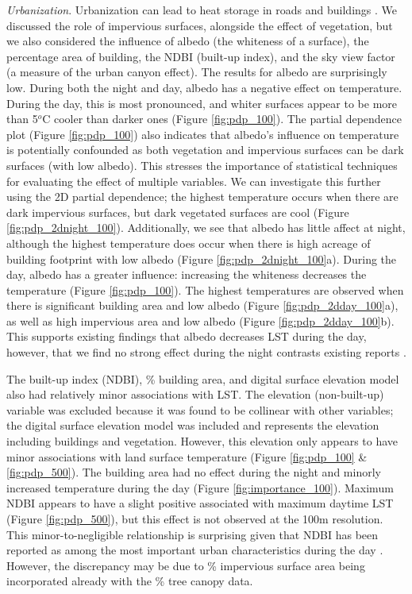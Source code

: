 \documentclass[review]{elsarticle}
\begin{document}
\textit{Urbanization}.
Urbanization can lead to heat storage in roads and buildings \cite{Zhou2014-wc, Voogt2003-mm}. 
We discussed the role of impervious surfaces, alongside the effect of vegetation, but we also considered the influence of albedo (the whiteness of a surface), the percentage area of building, the NDBI (built-up index), and the sky view factor (a measure of the urban canyon effect).
The results for albedo are surprisingly low.
During both the night and day, albedo has a negative effect on temperature.
During the day, this is most pronounced, and whiter surfaces appear to be more than 5$^o$C cooler than darker ones (Figure \ref{fig:pdp_100}).
The partial dependence plot (Figure \ref{fig:pdp_100}) also indicates that albedo's influence on temperature is potentially confounded as both vegetation and impervious surfaces can be dark surfaces (with low albedo).
This stresses the importance of statistical techniques for evaluating the effect of multiple variables.
We can investigate this further using the 2D partial dependence; the highest temperature occurs when there are dark impervious surfaces, but dark vegetated surfaces are cool (Figure \ref{fig:pdp_2dnight_100}).
Additionally, we see that albedo has little affect at night, although the highest temperature does occur when there is high acreage of building footprint with low albedo (Figure \ref{fig:pdp_2dnight_100}a).
During the day, albedo has a greater influence: increasing the whiteness decreases the temperature (Figure \ref{fig:pdp_100}).
The highest temperatures are observed when there is significant building area and low albedo (Figure \ref{fig:pdp_2dday_100}a), as well as high impervious area and low albedo (Figure \ref{fig:pdp_2dday_100}b).
This supports existing findings that albedo decreases LST during the day, however, that we find no strong effect during the night contrasts existing reports \cite{Peng2012-iy, Zhou2014-wc}.

The built-up index (NDBI), \% building area, and digital surface elevation model also had relatively minor associations with LST.
The elevation (non-built-up) variable was excluded because it was found to be collinear with other variables; the digital surface elevation model was included and represents the elevation including buildings and vegetation.
However, this elevation only appears to have minor associations with land surface temperature (Figure \ref{fig:pdp_100} \& \ref{fig:pdp_500}).
The building area had no effect during the night and minorly increased temperature during the day (Figure \ref{fig:importance_100}).
Maximum NDBI appears to have a slight positive associated with maximum daytime LST (Figure \ref{fig:pdp_500}), but this effect is not observed at the 100m resolution.
This minor-to-negligible relationship is surprising given that NDBI has been reported as among the most important urban characteristics during the day \cite{Peng2018-cp}.
However, the discrepancy may be due to \% impervious surface area being incorporated already with the \% tree canopy data.
\end{document}
